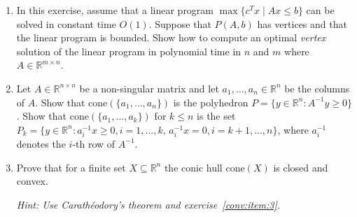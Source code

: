 \documentclass[11pt]{article}
\newcommand{\setR}{\mathbb{R}}
\renewcommand{\leq}{\leqslant}
\renewcommand{\geq}{\geqslant}
\newcommand{\cone}{\mathrm{cone}}
\begin{document}
\begin{enumerate}[1)]
\item In this exercise, assume that a linear program $\max\{c^Tx \mid
  Ax\leq b \}$ can be solved in constant time $O(1)$. Suppose that $P(A,b)$
  has vertices and that the linear program is bounded. Show how to
  compute an optimal \emph{vertex} solution of the linear
  program in polynomial time in $n$ and $m$ where $A \in \mathbb{R}^{m \times n}$. 
  
  \item Let $A \in \setR^{n\times n}$ be a non-singular matrix and let
  $a_1,\ldots,a_n\in \setR^n$ be the columns of $A$.  Show that
  $\cone(\{a_1,\ldots,a_n\})$ is the polyhedron $P = \{ y \in \setR^n \colon
  A^{-1} y\geq0\}$. \label{conv:item:3} Show that $\cone(\{a_1,\ldots,a_k\})$ for
  $k\leq n$ is the set $P_k = \{y \in \setR^n \colon
  a_i^{-1} x\geq0, i=1,\ldots,k, \, a_i^{-1}x = 0, i=k+1,\ldots,n\}$, where
  $a_i^{-1}$ denotes the $i$-th row of $A^{-1}$. 
  
\item Prove that for a finite set $X\subseteq\setR^n$ the conic hull $\cone(X)$ is closed
  and convex. \label{conv:item:2} 
  
  \emph{Hint: Use Carath\'eodory's theorem and exercise~\ref{conv:item:3}.}


\end{enumerate}



  
\end{document}
